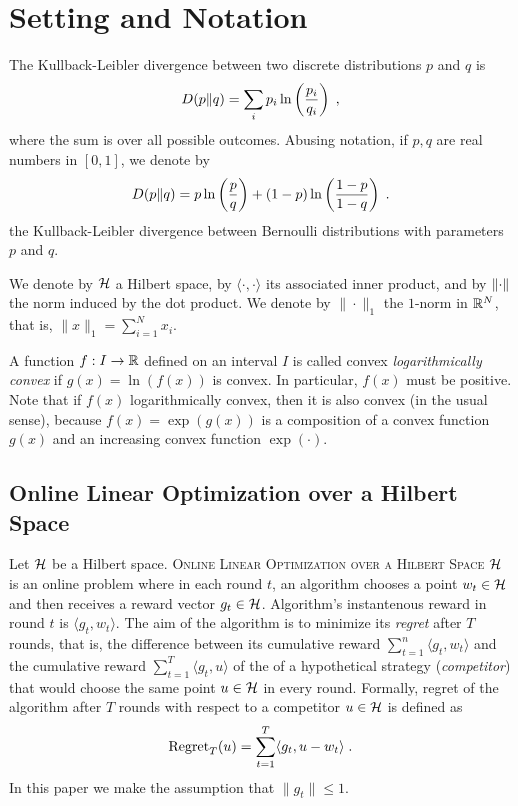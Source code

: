 \section{Setting and Notation}

The Kullback-Leibler divergence between two discrete
distributions $p$ and $q$ is
$$
D({p}\|{q}) = \sum_{i} p_i \ln\left( \frac{p_i}{q_i} \right) \; ,
$$
where the sum is over all possible outcomes. Abusing notation, if $p,q$ are real
numbers in $[0,1]$, we denote by
$$
D({p}\|{q}) = p \ln \left(\frac{p}{q} \right) + (1-p) \ln \left(\frac{1-p}{1-q} \right) \; .
$$
the Kullback-Leibler divergence between Bernoulli distributions with parameters
$p$ and $q$.

We denote by $\mathcal{H}$ a Hilbert space, by $\langle \cdot, \cdot\rangle$ its
associated inner product, and by $\left\|{\cdot}\right\|$ the norm induced by the dot
product. We denote by $\|\cdot\|_1$ the $1$-norm in $\mathbb{R}^N$, that is, $\|x\|_1 =
\sum_{i=1}^N x_i$.

A function $f:I \to \mathbb{R}$ defined on an interval $I$ is called convex
\emph{logarithmically convex} if $g(x) = \ln(f(x))$ is convex. In particular,
$f(x)$ must be positive. Note that if $f(x)$ logarithmically convex, then it is
also convex (in the usual sense), because $f(x) = \exp(g(x))$ is a composition
of a convex function $g(x)$ and an increasing convex function $\exp(\cdot)$.


\subsection{Online Linear Optimization over a Hilbert Space}

Let $\mathcal{H}$ be a Hilbert space. \textsc{Online Linear Optimization over a Hilbert
Space $\mathcal{H}$} is an online problem where in each round $t$, an algorithm chooses a
point $w_t \in \mathcal{H}$ and then receives a reward vector $g_t \in \mathcal{H}$. Algorithm's
instantenous reward in round $t$ is $\langle g_t, w_t \rangle$. The aim of the
algorithm is to minimize its \emph{regret} after $T$ rounds, that is, the
difference between its cumulative reward $\sum_{t=1}^n \langle g_t, w_t \rangle$
and the cumulative reward $\sum_{t=1}^T \langle g_t, u \rangle$ of the of a
hypothetical strategy (\emph{competitor}) that would choose the same point $u
\in \mathcal{H}$ in every round. Formally, regret of the algorithm after $T$ rounds with
respect to a competitor $u \in \mathcal{H}$ is defined as
\begin{equation}
\label{equation:regret-definition}
\operatorname{Regret}_T(u) = \sum_{t=1}^T \langle g_t , u - w_t \rangle \; .
\end{equation}
In this paper we make the assumption that $\|g_t\| \le 1$.


